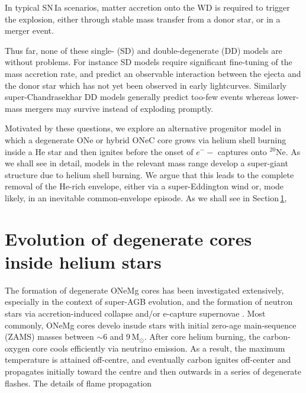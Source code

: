 \documentclass[twocolumn,tighten,times]{aastex62}
\begin{document}
 In  typical SN\,Ia scenarios, matter accretion onto the WD is required to trigger the explosion, either through stable mass transfer from a donor star,  or in a merger event.  
 
 
 
Thus far, none of these single- (SD) and double-degenerate (DD) models 
are without problems. For instance SD models require significant 
fine-tuning of the mass accretion rate, and predict an observable 
interaction between the ejecta and the donor star which has not yet 
been observed in early lightcurves. 
Similarly super-Chandrasekhar DD models generally 
predict too-few events whereas lower-mass mergers may survive instead of exploding promptly. 

Motivated by these questions, we explore an alternative progenitor model
in which a degenerate ONe or hybrid ONeC core grows via helium shell burning 
inside a He star and then ignites before the onset of $e^{-}-$ captures onto $^{20}$Ne. 
As we shall see in detail, models in the relevant mass range develop a 
super-giant structure due to helium shell burning. We argue that 
this leads to the complete removal of the He-rich envelope, 
either via a super-Eddington wind or, mode likely, in an inevitable common-envelope episode. 
As we shall see in Section\,\ref{sec:2}, 


\section{Evolution of degenerate cores inside helium stars}\label{sec:2}
The formation of degenerate ONeMg cores has been investigated extensively, 
especially in the context of super-AGB evolution, 
and the formation of neutron stars via accretion-induced collapse 
and/or e-capture supernovae \citep[][]{Chen:2014,Denissenkov:2013qaa,Schwab:2015bma,Lecoanet:2016,Meyer:2017elq}.
Most commonly, ONeMg cores develo insude stars with initial zero-age 
main-sequence (ZAMS) masses between $\sim 6$ and 9\,M$_{\odot}$. 
After core helium burning, the carbon-oxygen core cools efficiently via neutrino emission. 
As a result, the maximum temperature is attained off-centre, and eventually 
carbon ignites off-center and propagates initially toward the centre and then outwards 
in a series of degenerate flashes. The details of flame propagation 
\end{document}
